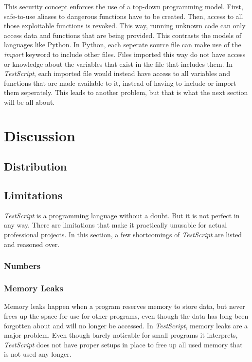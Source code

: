 \documentclass[12pt,a4paper]{article}
\newcommand{\name}{\emph{TestScript}}
\begin{document}
This security concept enforces the use of a top-down programming model. First, safe-to-use aliases
to dangerous functions have to be created. Then, access to all those exploitable functions is
revoked. This way, running unknown code can only access data and functions that are being provided.
This contrasts the models of languages like Python. In Python, each seperate source file can
make use of the \emph{import} keyword to include other files. Files imported this way do not
have access or knowledge about the variables that exist in the file that includes them.
In \name{}, each imported file would instead have access to all variables and functions that
are made available to it, instead of having to include or import them seperately.
This leads to another problem, but that is what the next section will be all about.

\section{Discussion}

\subsection{Distribution}

\subsection{Limitations}\label{Limitations}
\name{} is a programming language without a doubt. But it is not perfect in any
way. There are limitations that make it practically unusable for actual
professional projects. In this section, a few shortcomings of \name{} are listed
and reasoned over.

\subsubsection{Numbers}

\subsubsection{Memory Leaks}
Memory leaks happen when a program reserves memory to store data, but
never frees up the space for use for other programs, even though the data
has long been forgotten about and will no longer be accessed.
In \name{}, memory leaks are a major problem. Even though barely noticable for small
programs it interprets, \name{} does not have proper setups in place to free up
all used memory that is not used any longer.
\end{document}

